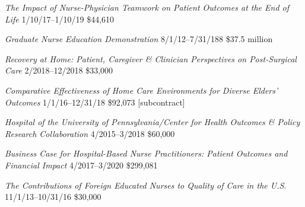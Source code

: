 \documentclass[10pt,]{article}
\begin{document}
{{{{{{{{{{{{{{

\textit {The Impact of Nurse-Physician Teamwork on Patient Outcomes at the End of Life} \hfill 1/10/17--1/10/19 \newline
{}	\hfill \$44,610

\textit {Graduate Nurse Education Demonstration} \hfill 8/1/12--7/31/188 \newline
{}	\hfill \$37.5 million

\textit {Recovery at Home: Patient, Caregiver \& Clinician Perspectives on Post-Surgical Care} \hfill 2/2018--12/2018 \newline
{}	\hfill \$33,000

\textit {Comparative Effectiveness of Home Care Environments for Diverse Elders’ Outcomes} \hfill 1/1/16--12/31/18 \newline
{}	\hfill \$92,073 [subcontract]

\textit {Hospital of the University of Pennsylvania/Center for Health Outcomes \& Policy Research Collaboration} \hfill 4/2015--3/2018 \newline
{}		\hfill \$60,000

\textit {Business Case for Hospital-Based Nurse Practitioners: Patient Outcomes and Financial Impact} \hfill 4/2017--3/2020 \newline
{}	\hfill \$299,081

\textit {The Contributions of Foreign Educated Nurses to Quality of Care in the U.S.} \hfill 11/1/13--10/31/16 \newline
{}	\hfill \$30,000

}}}}}}}}}}}}}}
\end{document}
